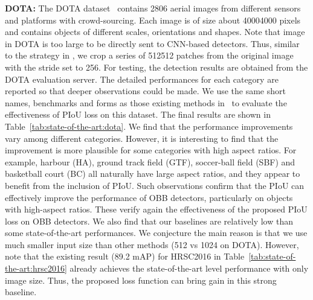 \noindent\textbf{DOTA:}
The DOTA dataset~\cite{Xia2018DAS} contains 2806 aerial images from different sensors and platforms with crowd-sourcing. Each image is of size about 40004000 pixels and contains objects of different scales, orientations and shapes. Note that image in DOTA is too large to be directly sent to CNN-based detectors. Thus, similar to the strategy in \cite{Xia2018DAS}, we crop a series of 512512 patches from the original image with the stride set to 256. For testing, the detection results are obtained from the DOTA evaluation server. The detailed performances for each category are reported so that deeper observations could be made. We use the same short names, benchmarks and forms as those existing methods in~\cite{Yang2019RRS} to evaluate the effectiveness of PIoU loss on this dataset. The final results are shown in Table~\ref{tab:state-of-the-art:dota}.
We find that the performance improvements vary among different categories. However, it is interesting to find that the improvement is more plausible for some categories with high aspect ratios. For example, harbour (HA), ground track field (GTF), soccer-ball field (SBF) and basketball court (BC) all naturally have large aspect ratios, and they appear to benefit from the inclusion of PIoU. Such observations confirm that the PIoU can effectively improve the performance of OBB detectors, particularly on objects with high-aspect ratios. These verify again the effectiveness of the proposed PIoU loss on OBB detectors. We also find that our baselines are relatively low than some state-of-the-art performances. We conjecture the main reason is that we use much smaller input size than other methods (512 vs 1024 on DOTA). However, note that the existing result (89.2 mAP) for HRSC2016 in Table~\ref{tab:state-of-the-art:hrsc2016} already achieves the state-of-the-art level performance with only  image size. Thus, the proposed loss function can bring gain in this strong baseline.

